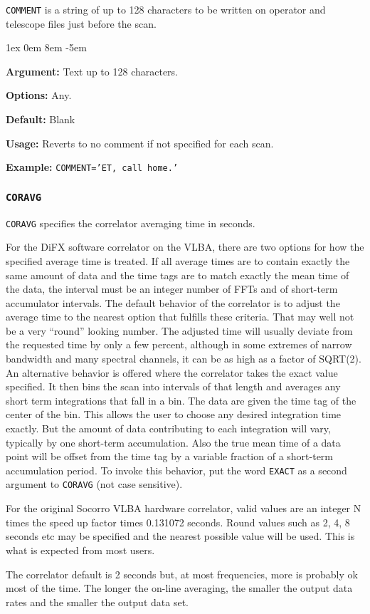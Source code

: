 \documentclass{report}
\newcommand{\rcwbox}[5]{
  \begin{list}{}{\parsep 1ex  \itemsep 0em
                 \leftmargin 8em  \itemindent -5em }
    \item {\bf Argument:} #1
    \item {\bf Options:}  #2
    \item {\bf Default:}  #3
    \item {\bf Usage:}    #4
    \item {\bf Example:}  #5
  \end{list}
}
\begin{document}
{\tt COMMENT} is a string of up to 128 characters to be written on
operator and telescope files just before the scan.

\rcwbox
{Text up to 128 characters.}
{Any.}
{Blank}
{Reverts to no comment if not specified for each scan.}
{{\tt COMMENT='ET, call home.'}}


\subsubsection{\label{MP:CORAVG}{\tt CORAVG}}

{\tt CORAVG} specifies the correlator averaging time in seconds.

For the DiFX software correlator on the VLBA, there are two options
for how the specified average time is treated.  If all average times
are to contain exactly the same amount of data and the time tags are
to match exactly the mean time of the data, the interval must be
an integer number of FFTs and of short-term accumulator intervals.
The default behavior of the correlator is to adjust the average time
to the nearest option that fulfills these criteria.  That may well not
be a very ``round'' looking number.  The adjusted time will usually
deviate from the requested time by only a few percent, although in some
extremes of narrow bandwidth and many spectral channels, it can be as
high as a factor of SQRT(2).  An alternative behavior is
offered where the correlator takes the exact value specified.  It then
bins the scan into intervals of that length and averages any short
term integrations that fall in a bin.  The data are given the time
tag of the center of the bin.  This allows the user to choose any
desired integration time exactly.  But the amount of data contributing
to each integration will vary, typically by one short-term
accumulation. Also the true mean time of a data point will be offset
from the time tag by a variable fraction of a short-term accumulation
period.  To invoke this behavior, put the word {\tt EXACT} as a second
argument to {\tt CORAVG} (not case sensitive).

For the original Socorro VLBA hardware correlator, valid values are an
integer N times the speed up factor times 0.131072 seconds.  Round
values such as 2, 4, 8 seconds etc may be specified and the nearest
possible value will be used.  This is what is expected from most
users.

The correlator default is 2 seconds but, at most frequencies, more is
probably ok most of the time.  The longer the on-line averaging, the
smaller the output data rates and the smaller the output data set.
\end{document}
